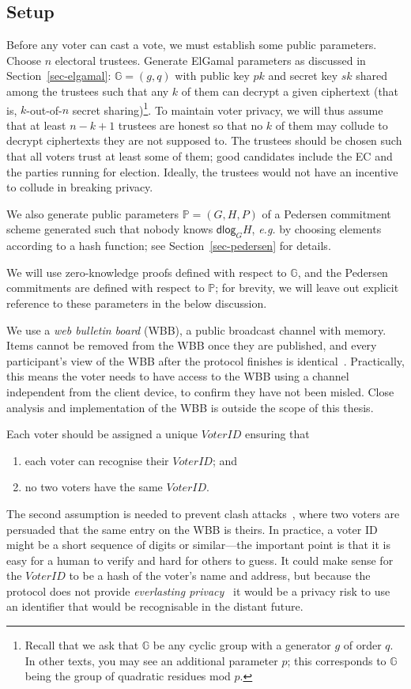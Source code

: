 \documentclass[12pt,a4paper]{article}
\theoremstyle{definition}
\newcommand{\VoterID}{\mathit{VoterID}}
\newcommand{\eg}{\textit{e.g. }}
\begin{document}
\subsection{Setup}
Before any voter can cast a vote, we must establish some public parameters. Choose $n$ electoral trustees. Generate ElGamal parameters as discussed in Section~\ref{sec-elgamal}: $\mathbb{G}=(g, q)$ with public key $pk$ and secret key $sk$ shared among the trustees such that any $k$ of them can decrypt a given ciphertext (that is, $k$-out-of-$n$ secret sharing)\footnote{Recall that we ask that $\mathbb{G}$ be any cyclic group with a generator $g$ of order $q$. In other texts, you may see an additional parameter $p$; this corresponds to $\mathbb{G}$ being the group of quadratic residues mod $p$.}. To maintain voter privacy, we will thus assume that at least $n - k + 1$ trustees are honest so that no $k$ of them may collude to decrypt ciphertexts they are not supposed to. The trustees should be chosen such that all voters trust at least some of them; good candidates include the EC and the parties running for election. Ideally, the trustees would not have an incentive to collude in breaking privacy.

We also generate public parameters $\mathbb{P}=(G, H, P)$ of a Pedersen commitment scheme generated such that nobody knows $\mathsf{dlog}_G{H}$, \eg by choosing elements according to a hash function; see Section~\ref{sec-pedersen} for details.

We will use zero-knowledge proofs defined with respect to $\mathbb{G}$, and the Pedersen commitments are defined with respect to $\mathbb{P}$; for brevity, we will leave out explicit reference to these parameters in the below discussion.

We use a \textit{web bulletin board} (WBB), a public broadcast channel with memory. Items cannot be removed from the WBB once they are published, and every participant's view of the WBB after the protocol finishes is identical~\cite{culnane2014peered,hirschi2020fixing}. Practically, this means the voter needs to have access to the WBB using a channel independent from the client device, to confirm they have not been misled. Close analysis and implementation of the WBB is outside the scope of this thesis.

Each voter should be assigned a unique $\VoterID$ ensuring that
\begin{enumerate}
    \item each voter can recognise their $\VoterID$; and
    \item no two voters have the same $\VoterID$.
\end{enumerate}
The second assumption is needed to prevent clash attacks~\cite{kusters2012clash}, where two voters are persuaded that the same entry on the WBB is theirs. In practice, a voter ID might be a short sequence of digits or similar---the important point is that it is easy for a human to verify and hard for others to guess. It could make sense for the $\VoterID$ to be a hash of the voter's name and address, but because the protocol does not provide \textit{everlasting privacy}~\cite{moran2006receipt} it would be a privacy risk to use an identifier that would be recognisable in the distant future.
\end{document}

